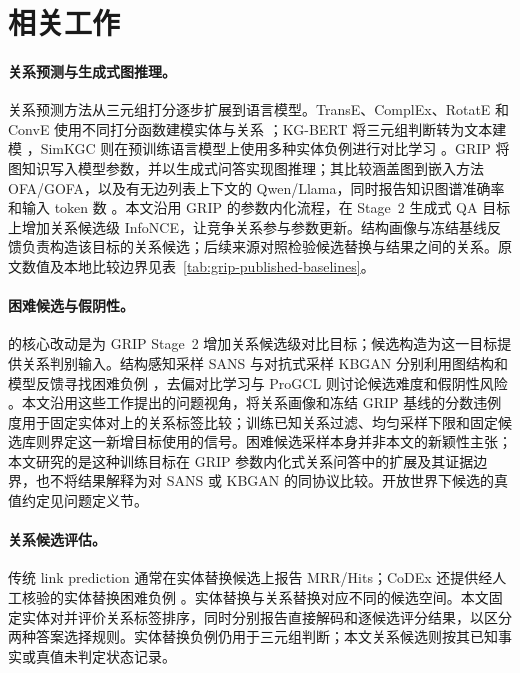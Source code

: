 \section{相关工作}

\paragraph{关系预测与生成式图推理。}
关系预测方法从三元组打分逐步扩展到语言模型。TransE、ComplEx、RotatE 和 ConvE 使用不同打分函数建模实体与关系 \citep{bordes2013transe,trouillon2016complex,sun2019rotate,dettmers2018conve}；KG-BERT 将三元组判断转为文本建模 \citep{yao2019kgbert}，SimKGC 则在预训练语言模型上使用多种实体负例进行对比学习 \citep{wang2022simkgc}。GRIP 将图知识写入模型参数，并以生成式问答实现图推理；其比较涵盖图到嵌入方法 OFA/GOFA，以及有无边列表上下文的 Qwen/Llama，同时报告知识图谱准确率和输入 token 数 \citep{feng2026grip}。本文沿用 GRIP 的参数内化流程，在 Stage~2 生成式 QA 目标上增加关系候选级 InfoNCE，让竞争关系参与参数更新。结构画像与冻结基线反馈负责构造该目标的关系候选；后续来源对照检验候选替换与结果之间的关系。原文数值及本地比较边界见表~\ref{tab:grip-published-baselines}。

\paragraph{困难候选与假阴性。}
\scc{} 的核心改动是为 GRIP Stage~2 增加关系候选级对比目标；候选构造为这一目标提供关系判别输入。结构感知采样 SANS 与对抗式采样 KBGAN 分别利用图结构和模型反馈寻找困难负例 \citep{ahrabian2020sans,cai2018kbgan}，去偏对比学习与 ProGCL 则讨论候选难度和假阴性风险 \citep{chuang2020dcl,xia2022progcl}。本文沿用这些工作提出的问题视角，将关系画像和冻结 GRIP 基线的分数违例度用于固定实体对上的关系标签比较；训练已知关系过滤、均匀采样下限和固定候选库则界定这一新增目标使用的信号。困难候选采样本身并非本文的新颖性主张；本文研究的是这种训练目标在 GRIP 参数内化式关系问答中的扩展及其证据边界，也不将结果解释为对 SANS 或 KBGAN 的同协议比较。开放世界下候选的真值约定见问题定义节。

\paragraph{关系候选评估。}
传统 link prediction 通常在实体替换候选上报告 MRR/Hits；CoDEx 还提供经人工核验的实体替换困难负例 \citep{safavi2020codex}。实体替换与关系替换对应不同的候选空间。本文固定实体对并评价关系标签排序，同时分别报告直接解码和逐候选评分结果，以区分两种答案选择规则。实体替换负例仍用于三元组判断；本文关系候选则按其已知事实或真值未判定状态记录。
